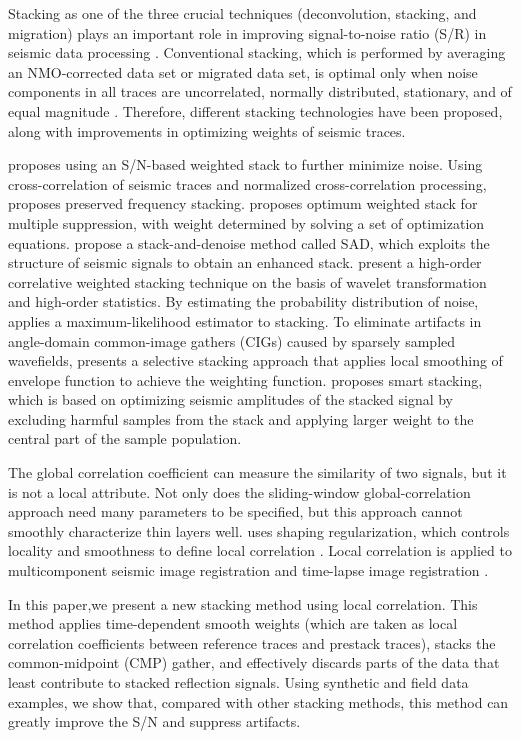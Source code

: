 Stacking as one of the three crucial techniques (deconvolution,
stacking, and migration) plays an important role in improving 
signal-to-noise ratio (S/R) in seismic data processing \cite[]{Yilmaz01}.
Conventional stacking, which is performed by averaging an NMO-corrected
data set or migrated data set, is optimal only when noise
components in all traces are uncorrelated, normally distributed, stationary,
and of equal magnitude \cite[]{Mayne62,Neelamani06}. Therefore, different 
stacking technologies have been proposed,
along with improvements in optimizing weights of seismic
traces.

\cite{Robinson70} proposes using an S/N-based weighted stack to
further minimize noise. Using cross-correlation of seismic traces and
normalized cross-correlation processing, \cite{Chang96} proposes
preserved frequency stacking. \cite{Schoenberger96} proposes optimum
weighted stack for multiple suppression, with weight determined
by solving a set of optimization equations. \cite{Neelamani06} 
propose a stack-and-denoise method called SAD, which exploits
the structure of seismic signals to obtain an enhanced stack.
\cite{Zhang06} present a high-order correlative weighted
stacking technique on the basis of wavelet transformation and high-order
statistics. By estimating the probability distribution of noise,
\cite{Trickett07} applies a maximum-likelihood estimator to stacking.
To eliminate artifacts in angle-domain common-image gathers
(CIGs) caused by sparsely sampled wavefields, \cite{Tang07} presents
a selective stacking approach that applies local smoothing of
envelope function to achieve the weighting function. \cite{Rashed08}
proposes smart stacking, which is based on optimizing seismic amplitudes
of the stacked signal by excluding harmful samples from the
stack and applying larger weight to the central part of the sample
population.

The global correlation coefficient can measure the similarity of
two signals, but it is not a local attribute. Not only does the sliding-window
global-correlation approach need many parameters to be
specified, but this approach cannot smoothly characterize thin layers
well. \cite{Fomel07a} uses shaping regularization, which controls locality
and smoothness to define local correlation \cite[]{Fomel07b}.
Local correlation is applied to multicomponent seismic image registration
\cite[]{Fomel05,Fomel07b} and time-lapse image registration
\cite[]{Fomel07}.

In this paper,we present a new stacking method using local correlation.
This method applies time-dependent smooth weights (which
are taken as local correlation coefficients between reference traces
and prestack traces), stacks the common-midpoint (CMP) gather,
and effectively discards parts of the data that least contribute to
stacked reflection signals. Using synthetic and field data examples,
we show that, compared with other stacking methods, this method
can greatly improve the S/N and suppress artifacts.

